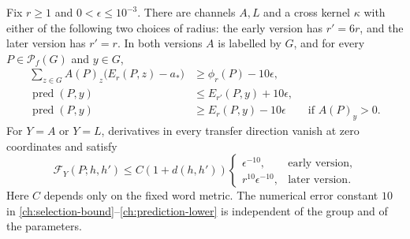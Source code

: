 \begin{proposition}
\label{ch:summary}
Fix $r\ge1$ and $0<\epsilon\le10^{-3}$.  There are channels $A,L$ and a
cross kernel $\kappa$ with either of the following two choices of radius:
the early version has $r'=6r$, and the later version has $r'=r$.
In both versions $A$ is labelled by $G$, and for every
$P\in\mathcal P_f(G)$ and $y\in G$,
\begin{align}
 \sum_{z\in G}A(P)_z\bigl(E_r(P,z)-a_*\bigr)
       &\ge\phi_r(P)-10\epsilon,
       \label{ch:selection-bound}\\
 \operatorname{pred}(P,y)
       &\le E_{r'}(P,y)+10\epsilon,
       \label{ch:prediction-upper}\\
 \operatorname{pred}(P,y)
       &\ge E_r(P,y)-10\epsilon
       \qquad\text{if }A(P)_y>0.
       \label{ch:prediction-lower}
\end{align}
For $Y=A$ or $Y=L$, derivatives in every transfer direction vanish at zero
coordinates and satisfy
\begin{equation}
 \mathcal F_Y(P;h,h')\le C(1+d(h,h'))
 \begin{cases}
   \epsilon^{-10},&\text{early version},\\
   r^{10}\epsilon^{-10},&\text{later version}.
 \end{cases}
 \label{ch:summary-fisher}
\end{equation}
Here $C$ depends only on the fixed word metric.  The numerical error constant
$10$ in \eqref{ch:selection-bound}--\eqref{ch:prediction-lower} is independent
of the group and of the parameters.
\end{proposition}

